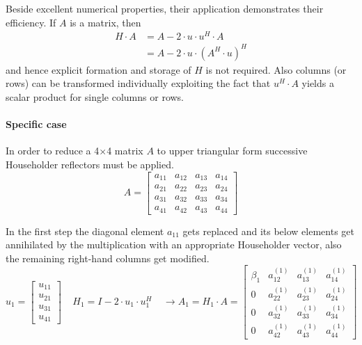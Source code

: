 Beside excellent numerical properties, their application demonstrates
their efficiency.  If $A$ is a matrix, then
\begin{align}
H\cdot A &= A - 2\cdot u\cdot u^H\cdot A\\
\nonumber
&=  A - 2\cdot u\cdot \left(A^H\cdot u\right)^H
\end{align}
and hence explicit formation and storage of $H$ is not required.  Also
columns (or rows) can be transformed individually exploiting the fact
that $u^H\cdot A$ yields a scalar product for single columns or rows.

\paragraph{Specific case}

In order to reduce a 4$\times$4 matrix $A$ to upper triangular form
successive Householder reflectors must be applied.
\begin{equation}
A =
\begin{bmatrix}
a_{11} & a_{12} & a_{13} & a_{14}\\
a_{21} & a_{22} & a_{23} & a_{24}\\
a_{31} & a_{32} & a_{33} & a_{34}\\
a_{41} & a_{42} & a_{43} & a_{44}
\end{bmatrix}
\end{equation}

In the first step the diagonal element $a_{11}$ gets replaced and its
below elements get annihilated by the multiplication with an
appropriate Householder vector, also the remaining right-hand columns
get modified.
\begin{equation}
u_1 =
\begin{bmatrix}
u_{11}\\
u_{21}\\
u_{31}\\
u_{41}
\end{bmatrix}
\;\;\;\;
H_1 = I - 2\cdot u_1\cdot u_1^H
\;\;\;\;
\rightarrow A_1 = H_1\cdot A =
\begin{bmatrix}
\beta_1 & a_{12}^{(1)} & a_{13}^{(1)} & a_{14}^{(1)}\\
0 & a_{22}^{(1)} & a_{23}^{(1)} & a_{24}^{(1)}\\
0 & a_{32}^{(1)} & a_{33}^{(1)} & a_{34}^{(1)}\\
0 & a_{42}^{(1)} & a_{43}^{(1)} & a_{44}^{(1)}
\end{bmatrix}
\end{equation}

